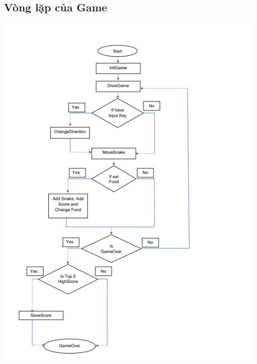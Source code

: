 \documentclass[13pt,a4paper]{article}
\begin{document}
\subsection{Vòng lặp của Game}
\includegraphics[width=\linewidth]{MainLoop.jpg} \\
\end{document}
